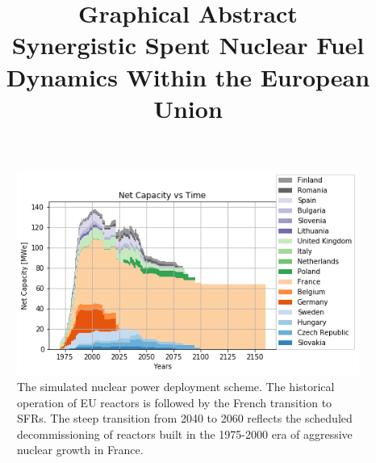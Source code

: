 \documentclass[review]{elsarticle}
\begin{document}
\begin{frontmatter}
\title{Graphical Abstract\\
Synergistic Spent Nuclear Fuel Dynamics Within the European Union}

\end{frontmatter}





\begin{figure}[htbp!]
    \begin{center}
        \includegraphics[width=\textwidth]{./onesim.png}
    \end{center}
    \caption{The simulated nuclear power deployment scheme. The historical operation of EU reactors is followed by the French transition to SFRs.  The steep transition from 2040 to 2060 reflects the scheduled decommissioning of reactors built in the 1975-2000 era of aggressive nuclear growth in France.}
    \label{fig:tot_dep}
\end{figure}
\end{document}
